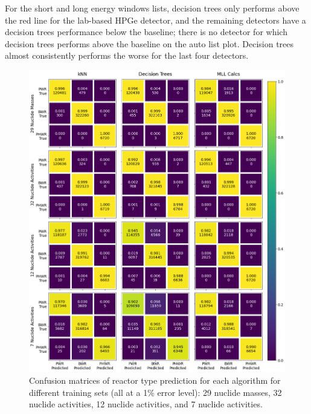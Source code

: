 For the short and long energy windows lists, decision trees only performs above
the red line for the lab-based \gls{HPGe} detector, and the remaining detectors
have a decision trees performance below the baseline; there is no detector for
which decision trees performs above the baseline on the auto list plot.
Decision trees almost consistently performs the worse for the last four
detectors.

\begin{figure}[H]
  \centering
  \includegraphics[width=\textwidth]{./chapters/exp2/confusion_matrix_nucs_acts.png}
  \caption{Confusion matrices of reactor type prediction for each algorithm 
           for different training sets (all at a 1\% error level): 29 nuclide 
           masses, 32 nuclide activities, 12 nuclide activities, and 7 nuclide 
           activities.}
  \label{fig:cm_nucs_acts}
\end{figure}

